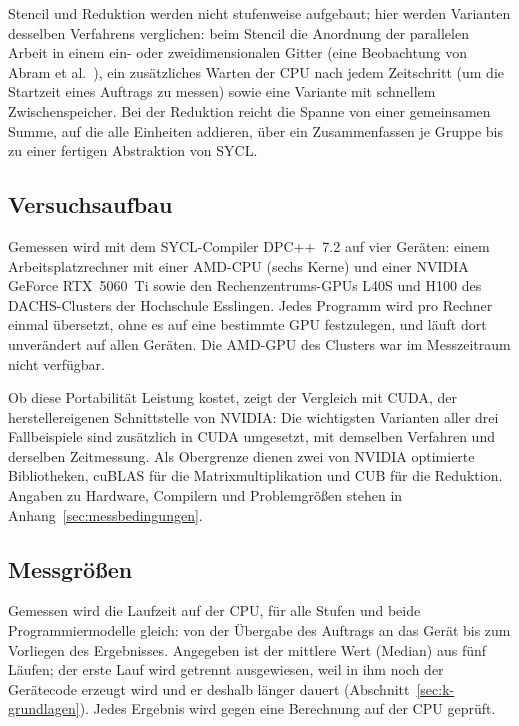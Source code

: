 \documentclass[12pt,a4paper]{article}
\begin{document}
Stencil und Reduktion werden nicht stufenweise aufgebaut; hier werden Varianten
desselben Verfahrens verglichen: beim Stencil die Anordnung der parallelen Arbeit
in einem ein- oder zweidimensionalen Gitter (eine Beobachtung von Abram et al.\
\cite{abram2025sycl}), ein zusätzliches Warten der CPU nach jedem Zeitschritt (um
die Startzeit eines Auftrags zu messen) sowie eine Variante mit schnellem
Zwischenspeicher. Bei der Reduktion reicht die Spanne von einer gemeinsamen
Summe, auf die alle Einheiten addieren, über ein Zusammenfassen je Gruppe bis zu
einer fertigen Abstraktion von SYCL.

\subsection{Versuchsaufbau}\label{sec:m-aufbau}

Gemessen wird mit dem SYCL-Compiler DPC++~7.2 \cite{intel_llvm} auf vier
Geräten: einem Arbeitsplatzrechner mit einer AMD-CPU (sechs Kerne) und einer
NVIDIA GeForce RTX~5060~Ti sowie den Rechenzentrums-GPUs L40S und H100 des
DACHS-Clusters der Hochschule Esslingen. Jedes Programm wird pro Rechner einmal
übersetzt, ohne es auf eine bestimmte GPU festzulegen, und läuft dort unverändert
auf allen Geräten. Die AMD-GPU des Clusters war im Messzeitraum nicht
verfügbar.

Ob diese Portabilität Leistung kostet, zeigt der Vergleich mit CUDA, der
herstellereigenen Schnittstelle von NVIDIA: Die wichtigsten Varianten aller drei
Fallbeispiele sind zusätzlich in CUDA umgesetzt, mit demselben Verfahren und
derselben Zeitmessung. Als Obergrenze dienen zwei von NVIDIA optimierte
Bibliotheken, cuBLAS \cite{nvidia_cublas} für die Matrixmultiplikation und CUB
\cite{nvidia_cub} für die Reduktion. Angaben zu Hardware, Compilern und
Problemgrößen stehen in Anhang~\ref{sec:messbedingungen}.

\subsection{Messgrößen}\label{sec:m-messgroessen}

Gemessen wird die Laufzeit auf der CPU, für alle Stufen und beide
Programmiermodelle gleich: von der Übergabe des Auftrags an das Gerät bis zum
Vorliegen des Ergebnisses. Angegeben ist der mittlere Wert
(Median) aus fünf Läufen; der erste Lauf wird getrennt ausgewiesen, weil in ihm
noch der Gerätecode erzeugt wird und er deshalb länger dauert
(Abschnitt~\ref{sec:k-grundlagen}). Jedes Ergebnis wird gegen eine Berechnung auf
der CPU geprüft.
\end{document}
